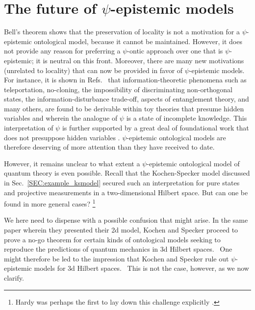 \documentclass[aps,nofootinbib,12pt]{revtex4-2}
\begin{document}
\section{The future of $\psi$-epistemic models
\label{SEC:discussion}}

Bell's theorem shows that the preservation of locality is not a
motivation for a $\psi$-epistemic ontological model, because it
cannot be maintained. However, it does not provide any reason for
preferring a $\psi$-ontic approach over one that is
$\psi$-epistemic; it is neutral on this front. Moreover, there are
many new motivations (unrelated to locality) that can now be
provided in favor of $\psi$-epistemic models. For instance, it is
shown in Refs.~\cite{toy_theory,BRSLiouville} that
information-theoretic phenomena such as teleportation, no-cloning,
the impossibility of discriminating non-orthogonal states, the
information-disturbance trade-off, aspects of entanglement theory,
and many others, are found to be derivable within toy theories that
presume hidden variables and wherein the analogue of $\psi$ is a
state of incomplete knowledge. This interpretation of $\psi$ is
further supported by a great deal of foundational work that does not
presuppose hidden variables
\cite{Emerson,Fuchs,FuchsJmodopt,Ballentine70,Ballentine94,Peierls,Leiferarxiv,Leiferpra,CFS02,CFS02arxiv,CFS06}.
$\psi$-epistemic ontological models are therefore deserving of more
attention than they have received to date.

However, it remains unclear to what extent a $\psi$-epistemic
ontological model of quantum theory is even possible. Recall that
the Kochen-Specker model discussed in Sec.~\ref{SEC:example_ksmodel}
secured such an interpretation for pure states and projective
measurements in a two-dimensional Hilbert space. But can one be
found in more general cases? \footnote{Hardy was perhaps the first
to lay down this challenge explicitly \cite{Hardyprivate}.}

We here need to dispense with a possible confusion that might arise.
In the same paper wherein they presented their 2d model, Kochen and
Specker proceed to prove a no-go theorem for certain kinds of
ontological models seeking to reproduce the predictions of quantum
mechanics in 3d Hilbert spaces. \ One might therefore be led to the
impression that Kochen and Specker rule out $\psi$-epistemic models
for 3d Hilbert spaces. \ This is not the case, however, as we now
clarify.
\end{document}
